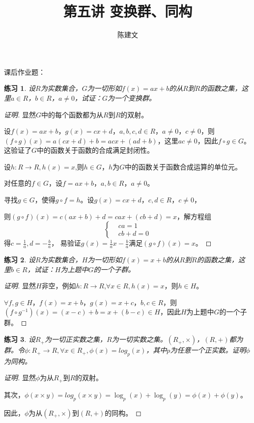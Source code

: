 \documentclass{article}
\newtheorem{Exercise}{练习}
\begin{document}
\begin{CJK*}{UTF8}{gbsn}
  \title{第五讲 变换群、同构}
  \author{陈建文}
  \maketitle
 

  
课后作业题：
\begin{Exercise}
设$R$为实数集合，$G$为一切形如$f(x)=ax+b$的从$R$到$R$的函数之集，这里$a\in R$，$b\in R$，$a\neq 0$，试证：$G$为一个变换群。
\end{Exercise}
\begin{proof}[证明]
  显然$G$中的每个函数都为从$R$到$R$的双射。
  
  设$f(x)=ax+b$，$g(x)=cx+d$，$a,b,c,d\in R$，$a\neq 0$，$c\neq 0$，则
  $(f\circ g)(x)=a(cx+d)+b=acx+(ad+b)$，这里$ac\neq 0$，因此$f\circ g\in G$。
这验证了$G$中的函数关于函数的合成满足封闭性。

设$h:R\to R,h(x)=x$,则$h\in G$，$h$为$G$中的函数关于函数合成运算的单位元。

对任意的$f\in G$，设$f=ax+b$，$a,b\in R$，$a\neq 0$。

寻找$g\in G$，使得$g\circ f=h$。设$g(x)=cx+d$，$c,d\in R$，$c\neq 0$，

则$(g\circ f)(x)=c(ax+b)+d=cax+(cb+d)=x$，解方程组
\begin{equation*}
  \left\{
    \begin{array}{rl}
      &ca=1\\
      &cb+d=0
    \end{array}
  \right.
\end{equation*}
得$c=\frac{1}{a},d=-\frac{b}{a}$，
易验证$g(x)=\frac{1}{a}x-\frac{b}{a}$满足$(g\circ f)(x)=x$。

\end{proof}
\begin{Exercise}
  设$R$为实数集合，$H$为一切形如$f(x)=x+b$的从$R$到$R$的函数之集，这里$b\in R$，试证：$H$为上题中$G$的一个子群。
\end{Exercise}
\begin{proof}[证明]
  显然$H$非空，例如$h:R\to R$,$\forall x\in R, h(x)=x$，则$h\in H$。

  $\forall f,g\in H$，$f(x)=x+b$，$g(x)=x+c$，$b,c\in R$，则$(f\circ g^{-1})(x)=(x-c)+b=x+(b-c)\in H$，因此$H$为上题中$G$的一个子群。
\end{proof}
\begin{Exercise}
设$R_+$为一切正实数之集，$R$为一切实数之集。$(R_+,\times)$，$(R,+)$都为群。令$\phi:R_+\to R,\forall x\in R_+,\phi(x)=log_p(x)$，其中$p$为任意一个正实数。证明$\phi$为同构。
\end{Exercise}
\begin{proof}[证明]
  显然$\phi$为从$R_+$到$R$的双射。

  其次，$\phi(x\times y)=log_p(x\times y)=\log_p(x)+\log_p(y)=\phi(x)+\phi(y)$。

  因此，$\phi$为从$(R_+,\times)$到$(R,+)$的同构。
\end{proof}
\end{CJK*}
\end{document}
